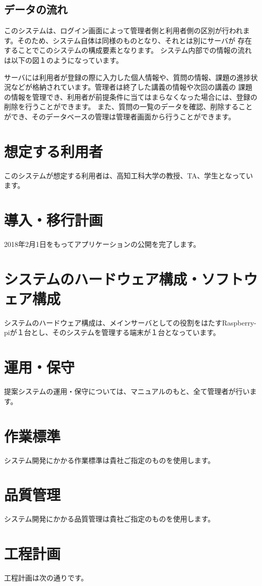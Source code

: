 \documentclass[a4j,titlepage]{ujarticle}
\begin{document}
\subsection{データの流れ}
このシステムは、ログイン画面によって管理者側と利用者側の区別が行われます。そのため、システム自体は同様のものとなり、それとは別にサーバが
存在することでこのシステムの構成要素となります。
システム内部での情報の流れは以下の図１のようになっています。

サーバには利用者が登録の際に入力した個人情報や、質問の情報、課題の進捗状況などが格納されています。管理者は終了した講義の情報や次回の講義の
課題の情報を管理でき、利用者が前提条件に当てはまらなくなった場合には、登録の削除を行うことができます。
また、質問の一覧のデータを確認、削除することができ、そのデータベースの管理は管理者画面から行うことができます。

\section{想定する利用者}
このシステムが想定する利用者は、高知工科大学の教授、TA、学生となっています。

\section{導入・移行計画}
2018年2月1日をもってアプリケーションの公開を完了します。
\section{システムのハードウェア構成・ソフトウェア構成}
システムのハードウェア構成は、メインサーバとしての役割をはたすRaspberry-piが１台とし、そのシステムを管理する端末が１台となっています。

\section{運用・保守}
提案システムの運用・保守については、マニュアルのもと、全て管理者が行います。
\section{作業標準}
システム開発にかかる作業標準は貴社ご指定のものを使用します。
\section{品質管理}
システム開発にかかる品質管理は貴社ご指定のものを使用します。
\section{工程計画}
工程計画は次の通りです。
\end{document}
